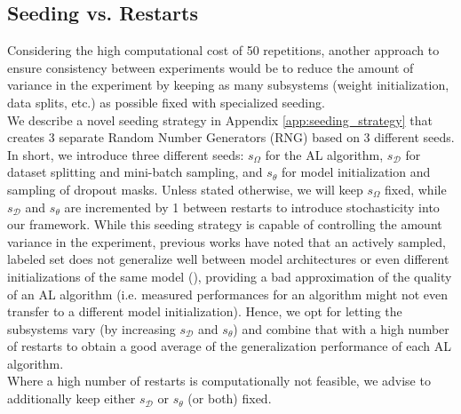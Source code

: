\documentclass[]{article}
\begin{document}
\subsection{Seeding vs. Restarts}\label{sec:reproducibility}
Considering the high computational cost of 50 repetitions, another approach to ensure consistency between experiments would be to reduce the amount of variance in the experiment by keeping as many subsystems (weight initialization, data splits, etc.) as possible fixed with specialized seeding. \\
We describe a novel seeding strategy in Appendix \ref{app:seeding_strategy} that creates 3 separate Random Number Generators (RNG) based on 3 different seeds.
In short, we introduce three different seeds: $s_\Omega$ for the AL algorithm, $s_\mathcal{D}$ for dataset splitting and mini-batch sampling, and $s_\theta$ for model initialization and sampling of dropout masks.
Unless stated otherwise, we will keep $s_\Omega$ fixed, while $s_\mathcal{D}$ and $s_\theta$ are incremented by 1 between restarts to introduce stochasticity into our framework.
While this seeding strategy is capable of controlling the amount variance in the experiment, previous works have noted that an actively sampled, labeled set does not generalize well between model architectures or even different initializations of the same model (\cite{zhou2021towards, lowell2018practical}), providing a bad approximation of the quality of an AL algorithm (i.e. measured performances for an algorithm might not even transfer to a different model initialization).
Hence, we opt for letting the subsystems vary (by increasing $s_\mathcal{D}$ and $s_\theta$) and combine that with a high number of restarts to obtain a good average of the generalization performance of each AL algorithm. \\
Where a high number of restarts is computationally not feasible, we advise to additionally keep either $s_\mathcal{D}$ or $s_\theta$ (or both) fixed.


\end{document}
